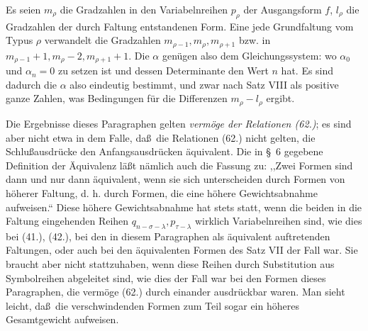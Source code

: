 Es seien $m_\rho$ die Gradzahlen in den Variabelnreihen $p_\rho$ der Ausgangsform $f$, $l_\rho$ die Gradzahlen der durch Faltung entstandenen Form. Eine jede Grundfaltung vom Typus $\rho$ verwandelt die Gradzahlen $m_{\rho-1},m_\rho,m_{\rho+1}$ bzw. in $m_{\rho-1}+1,m_\rho-2,m_{\rho+1}+1$. Die $\alpha$ gen\"ugen also dem Gleichungssystem:
wo $\alpha_0$ und $\alpha_n=0$ zu setzen ist und dessen Determinante den Wert $n$ hat. Es sind dadurch die $\alpha$ also eindeutig bestimmt, und zwar nach Satz VIII als positive ganze Zahlen, was Bedingungen f\"ur die Differenzen $m_\rho-l_\rho$ ergibt.

Die Ergebnisse dieses Paragraphen gelten \emph{verm\"oge der Relationen (62.)}; es sind aber nicht etwa in dem Falle, da\ss\ die Relationen (62.) nicht gelten, die Schlu\ss{}ausdr\"ucke den Anfangsausdr\"ucken \"aquivalent. Die in \S\ 6 gegebene Definition der \"Aquivalenz l\"a\ss t n\"amlich auch die Fassung zu: ,,Zwei Formen sind dann und nur dann \"aquivalent, wenn sie sich unterscheiden durch Formen von h\"oherer Faltung, d. h. durch Formen, die eine h\"ohere Gewichtsabnahme aufweisen.`` Diese h\"ohere Gewichtsabnahme hat stets statt, wenn die beiden in die Faltung eingehenden Reihen $q_{n-\sigma-\lambda},p_{\tau-\lambda}$ wirklich Variabelnreihen sind, wie dies bei (41.), (42.), bei den in diesem Paragraphen als \"aquivalent auftretenden Faltungen, oder auch bei den \"aquivalenten Formen des Satz VII der Fall war. Sie braucht aber nicht stattzuhaben, wenn diese Reihen durch Substitution aus Symbolreihen abgeleitet sind, wie dies der Fall war bei den Formen dieses Paragraphen, die verm\"oge (62.) durch einander ausdr\"uckbar waren. Man sieht leicht, da\ss\ die verschwindenden Formen zum Teil sogar ein h\"oheres Gesamtgewicht aufweisen.
